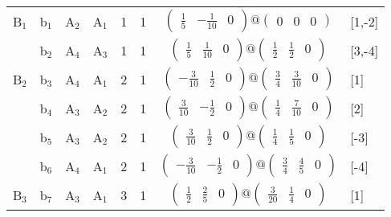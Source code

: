 \documentclass[fleqn,10pt,landscape]{article}
\begin{document}
\begin{itemize}
\begin{center}
\begin{longtable}{cc|cc|c|c|c|l}
B$_{1}$ & b$_{1}$ & A$_{2}$ & A$_{1}$ & 1 & 1 & $\begin{pmatrix} \frac{1}{5} & - \frac{1}{10} & 0 \end{pmatrix}@\begin{pmatrix} 0 & 0 & 0 \end{pmatrix}$ & [1,-2] \\
& b$_{2}$ & A$_{4}$ & A$_{3}$ & 1 & 1 & $\begin{pmatrix} \frac{1}{5} & \frac{1}{10} & 0 \end{pmatrix}@\begin{pmatrix} \frac{1}{2} & \frac{1}{2} & 0 \end{pmatrix}$ & [3,-4] \\ \hline
B$_{2}$ & b$_{3}$ & A$_{4}$ & A$_{1}$ & 2 & 1 & $\begin{pmatrix} - \frac{3}{10} & \frac{1}{2} & 0 \end{pmatrix}@\begin{pmatrix} \frac{3}{4} & \frac{3}{10} & 0 \end{pmatrix}$ & [1] \\
& b$_{4}$ & A$_{3}$ & A$_{2}$ & 2 & 1 & $\begin{pmatrix} \frac{3}{10} & - \frac{1}{2} & 0 \end{pmatrix}@\begin{pmatrix} \frac{1}{4} & \frac{7}{10} & 0 \end{pmatrix}$ & [2] \\
& b$_{5}$ & A$_{3}$ & A$_{2}$ & 2 & 1 & $\begin{pmatrix} \frac{3}{10} & \frac{1}{2} & 0 \end{pmatrix}@\begin{pmatrix} \frac{1}{4} & \frac{1}{5} & 0 \end{pmatrix}$ & [-3] \\
& b$_{6}$ & A$_{4}$ & A$_{1}$ & 2 & 1 & $\begin{pmatrix} - \frac{3}{10} & - \frac{1}{2} & 0 \end{pmatrix}@\begin{pmatrix} \frac{3}{4} & \frac{4}{5} & 0 \end{pmatrix}$ & [-4] \\ \hline
B$_{3}$ & b$_{7}$ & A$_{3}$ & A$_{1}$ & 3 & 1 & $\begin{pmatrix} \frac{1}{2} & \frac{2}{5} & 0 \end{pmatrix}@\begin{pmatrix} \frac{3}{20} & \frac{1}{4} & 0 \end{pmatrix}$ & [1] \\

\end{longtable}
\end{center}
\end{itemize}
\end{document}
